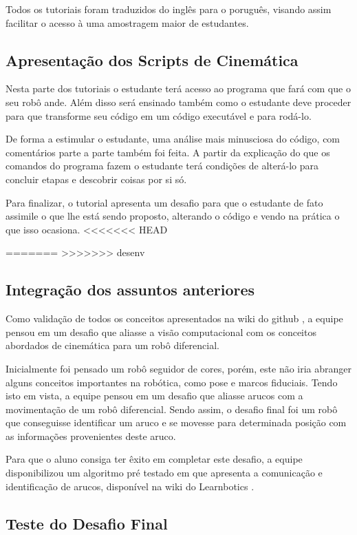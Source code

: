 Todos os tutoriais foram traduzidos do inglês para o poruguês, visando assim facilitar o acesso à uma amostragem maior de estudantes. \cite{tutROS}

\subsection{Apresentação dos Scripts de Cinemática}
Nesta parte dos tutoriais o estudante terá acesso ao programa que fará com que o seu robô ande. Além disso será ensinado também como o estudante deve proceder para que transforme seu código em um código executável e para rodá-lo.

De forma a estimular o estudante, uma análise mais minusciosa do código, com comentários parte a parte também foi feita. A partir da explicação do que os comandos do programa fazem o estudante terá condições de alterá-lo para concluir etapas e descobrir coisas por si só.

Para finalizar, o tutorial apresenta um desafio para que o estudante de fato assimile o que lhe está sendo proposto, alterando o código e vendo na prática o que isso ocasiona. \cite{tutCinemat}
<<<<<<< HEAD


=======
>>>>>>> desenv

\subsection{Integração dos assuntos anteriores}
Como validação de todos os conceitos apresentados na wiki do github \cite{wikiLearn}, a equipe pensou em um desafio que aliasse a visão computacional com os conceitos abordados de cinemática para um robô diferencial. 

Inicialmente foi pensado um robô seguidor de cores, porém, este não iria abranger alguns conceitos importantes na robótica, como pose e marcos fiduciais. Tendo isto em vista, a equipe pensou em um desafio que aliasse arucos com a movimentação de um robô diferencial. Sendo assim, o desafio final foi um robô que conseguisse identificar um aruco e se movesse para determinada posição com as informações provenientes deste aruco.

Para que o aluno consiga ter êxito em completar este desafio, a equipe disponibilizou um algoritmo pré testado em que apresenta a comunicação e identificação de arucos, disponível na wiki do Learnbotics \cite{tutFin}.


\subsection{Teste do Desafio Final}

